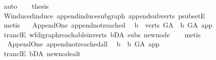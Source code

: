 \begin{isabellebody}
\ auto\isanewline
\ \ \isamarkupfalse%
\ {\isacharquery}{\kern0pt}thesis\isanewline
\ \ \ \ \isamarkupfalse%
\ W{\isachardot}{\kern0pt}induced{\isacharunderscore}{\kern0pt}induce\ append{\isacharunderscore}{\kern0pt}induce{\isacharunderscore}{\kern0pt}subgraph\ append{\isacharunderscore}{\kern0pt}subverts\ psubsetE\isanewline
\ \ \ \ \isamarkupfalse%
\ {\isacharparenleft}{\kern0pt}metis{\isacharparenright}{\kern0pt}\ \isanewline
{}\isamarkupfalse%
%
\endisatagproof
{\isafoldproof}%
%
\isadelimproof
\isanewline
%
\endisadelimproof
\isanewline
\isanewline
{}\isamarkupfalse%
\ {\isacharparenleft}{\kern0pt}\ Append{\isacharunderscore}{\kern0pt}One{\isacharparenright}{\kern0pt}\ append{\isacharunderscore}{\kern0pt}not{\isacharunderscore}{\kern0pt}reached{\isacharcolon}{\kern0pt}\isanewline
\ \ {\isachardoublequoteopen}{\isasymforall}b\ {\isasymin}\ verts\ G{\isacharunderscore}{\kern0pt}A{\isachardot}{\kern0pt}\ {\isasymnot}\ b\ {\isasymrightarrow}\isactrlsup {\isacharplus}{\kern0pt}\isactrlbsub G{\isacharunderscore}{\kern0pt}A\isactrlesub \ app{\isachardoublequoteclose}\isanewline
%
\isadelimproof
\ \ %
\endisadelimproof
%
\isatagproof
{}\isamarkupfalse%
\ tranclE\ wf{\isacharunderscore}{\kern0pt}digraph{\isachardot}{\kern0pt}reachable{}{\isacharunderscore}{\kern0pt}in{\isacharunderscore}{\kern0pt}verts{\isacharparenleft}{\kern0pt}{}{\isacharparenright}{\kern0pt}\ bD{\isacharunderscore}{\kern0pt}A\ subs{\isacharparenleft}{\kern0pt}{}{\isacharparenright}{\kern0pt}\ new{\isacharunderscore}{\kern0pt}node\isanewline
\ \ \isamarkupfalse%
\ metis%
\endisatagproof
{\isafoldproof}%
%
\isadelimproof
\ \ \isanewline
%
\endisadelimproof
\isanewline
\isanewline
{}\isamarkupfalse%
\ {\isacharparenleft}{\kern0pt}\ Append{\isacharunderscore}{\kern0pt}One{\isacharparenright}{\kern0pt}\ append{\isacharunderscore}{\kern0pt}not{\isacharunderscore}{\kern0pt}reached{\isacharunderscore}{\kern0pt}all{\isacharcolon}{\kern0pt}\isanewline
\ \ {\isachardoublequoteopen}{\isasymforall}b{\isachardot}{\kern0pt}\ {\isasymnot}\ b\ {\isasymrightarrow}\isactrlsup {\isacharplus}{\kern0pt}\isactrlbsub G{\isacharunderscore}{\kern0pt}A\isactrlesub \ app{\isachardoublequoteclose}\isanewline
%
\isadelimproof
\ \ %
\endisadelimproof
%
\isatagproof
{}\isamarkupfalse%
\ tranclE\ bD{\isacharunderscore}{\kern0pt}A\ new{\isacharunderscore}{\kern0pt}node{\isacharunderscore}{\kern0pt}alt\isanewline
\ \ \isamarkupfalse%

\end{isabellebody}
